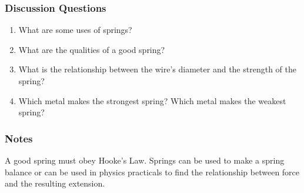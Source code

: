 \subsubsection*{Discussion Questions}
\begin{enumerate}
\item{What are some uses of springs?}
\item{What are the qualities of a good spring?}
\item{What is the relationship between the wire's diameter and the strength of the spring?}
\item{Which metal makes the strongest spring?  Which metal makes the weakest spring?}
\end{enumerate}

\subsubsection*{Notes}
A good spring must obey Hooke's Law.  Springs can be used to make a spring balance or can be used in physics practicals to find the relationship between force and the resulting extension.
